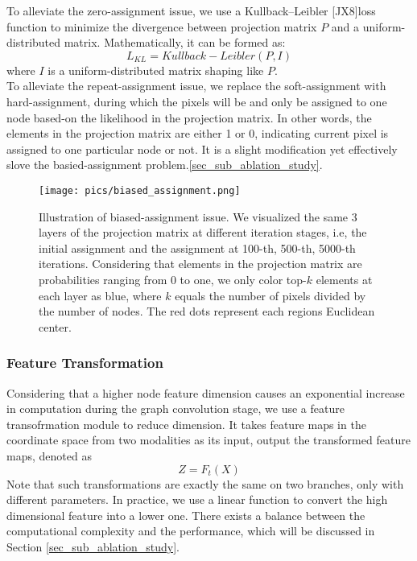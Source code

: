 ﻿\documentclass[journal]{IEEEtran}
\begin{document}
    To alleviate the zero-assignment issue, we use a Kullback–Leibler [JX8]loss function to minimize the divergence between projection matrix $P$ and a uniform-distributed matrix. Mathematically, it can be formed as:
    \begin{equation}\label{loss_kl}
        L_{KL} = Kullback-Leibler(P, I)
    \end{equation}
    where $I$ is a uniform-distributed matrix shaping like $P$. \\
    
    To alleviate the repeat-assignment issue, we replace the soft-assignment with hard-assignment, during which the pixels will be and only be assigned to one node based-on the likelihood in the projection matrix. In other words, the elements in the projection matrix are either 1 or 0, indicating current pixel is assigned to one particular node or not. It is a slight modification yet effectively slove the basied-assignment problem.\ref{sec_sub_ablation_study}. \\   
    
    
    \begin{figure}
        \centering
        \texttt{[image: pics/biased\_assignment.png]}
        \caption{Illustration of biased-assignment issue. We visualized the same 3 layers of the projection matrix at different iteration stages, i.e, the initial assignment and the assignment at 100-th, 500-th, 5000-th iterations. Considering that elements in the projection matrix are probabilities ranging from 0 to one, we only color top-$k$ elements at each layer as blue, where $k$ equals the number of pixels divided by the number of nodes. The red dots represent each regions Euclidean center.}
        \label{fig_biased_assignment}
    \end{figure} 
    

\subsubsection{Feature Transformation} \label{sec_sub_feature_transofrm}
    Considering that a higher node feature dimension causes an exponential increase in computation during the graph convolution stage, we use a feature transofrmation module to reduce dimension. It takes feature maps in the coordinate space from two modalities as its input, output the transformed feature maps, denoted as
    \begin{equation}
     Z = F_t(X)
    \end{equation}
    Note that such transformations are exactly the same on two branches, only with different parameters. In practice, we use a linear function to convert the high dimensional feature into a lower one. There exists a balance between the computational complexity and the performance, which will be discussed in Section \ref{sec_sub_ablation_study}. \\   
\end{document}
